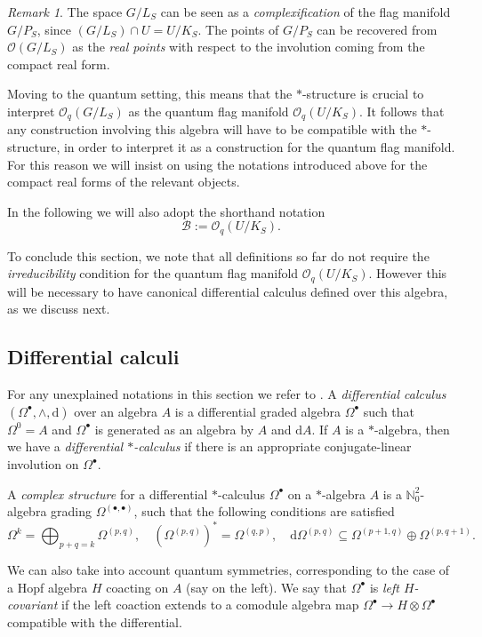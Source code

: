 \documentclass[a4paper,12pt,reqno,english]{amsart}
\numberwithin{equation}{section}
\numberwithin{figure}{section}
\theoremstyle{plain}
\theoremstyle{plain}
\theoremstyle{plain}
\theoremstyle{plain}
\theoremstyle{plain}
\theoremstyle{definition}
\theoremstyle{definition}
\theoremstyle{definition}
\theoremstyle{remark}
\newtheorem{remark}[theorem]{Remark}
\theoremstyle{definition}
\newcommand{\OqLevi}{\mathcal{O}_q(G / L_S)}
\newcommand{\Oqflag}{\mathcal{O}_q(U / K_S)}
\newcommand{\qalg}{\mathcal{B}}
\newcommand{\bbN}{\mathbb{N}}
\newcommand{\diff}{\mathrm{d}}
\begin{document}
\begin{remark}
The space $G / L_S$ can be seen as a \emph{complexification} of the flag manifold $G / P_S$, since $(G / L_S) \cap U = U / K_S$.
The points of $G / P_S$ can be recovered from $\mathcal{O}(G / L_S)$ as the \emph{real points} with respect to the involution coming from the compact real form.

Moving to the quantum setting, this means that the $*$-structure is crucial to interpret $\OqLevi$ as the quantum flag manifold $\Oqflag$.
It follows that any construction involving this algebra will have to be compatible with the $*$-structure, in order to interpret it as a construction for the quantum flag manifold.
For this reason we will insist on using the notations introduced above for the compact real forms of the relevant objects.
\end{remark}

In the following we will also adopt the shorthand notation
\[
\qalg := \Oqflag.
\]

To conclude this section, we note that all definitions so far do not require the \emph{irreducibility} condition for the quantum flag manifold $\Oqflag$.
However this will be necessary to have canonical differential calculus defined over this algebra, as we discuss next.

\subsection{Differential calculi}

For any unexplained notations in this section we refer to \cite{complex-structures}.
A \emph{differential calculus} $(\Omega^\bullet, \wedge, \diff)$ over an algebra $A$ is a differential graded algebra $\Omega^\bullet$ such that $\Omega^0 = A$ and $\Omega^\bullet$ is generated as an algebra by $A$ and $\diff A$.
If $A$ is a $*$-algebra, then we have a \emph{differential $*$-calculus} if there is an appropriate conjugate-linear involution on $\Omega^\bullet$.

A \emph{complex structure} for a differential $*$-calculus $\Omega^\bullet$ on a $*$-algebra $A$ is a $\bbN_0^2$-algebra grading $\Omega^{(\bullet, \bullet)}$, such that the following conditions are satisfied
\[
\Omega^k = \bigoplus_{p + q = k} \Omega^{(p, q)}, \quad
\left( \Omega^{(p, q)} \right)^* = \Omega^{(q, p)}, \quad
\diff \Omega^{(p, q)} \subseteq \Omega^{(p + 1, q)} \oplus \Omega^{(p, q + 1)}.
\]

We can also take into account quantum symmetries, corresponding to the case
of a Hopf algebra $H$ coacting on $A$ (say on the left). We say that $\Omega^\bullet$ is \emph{left $H$-covariant} if the left coaction extends to a comodule algebra map $\Omega^\bullet \to H \otimes \Omega^\bullet$ compatible with the differential.
\end{document}
